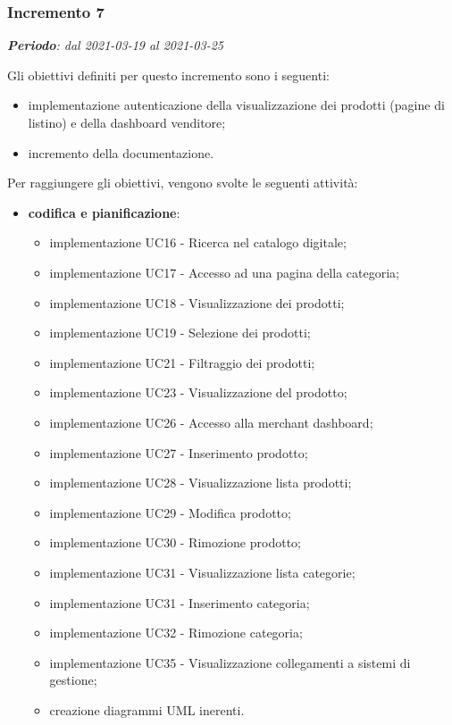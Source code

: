\subsubsection{Incremento 7}
\textit{\textbf{Periodo}: dal 2021-03-19 al 2021-03-25}

Gli obiettivi definiti per questo incremento sono i seguenti:
\begin{itemize}
\item implementazione autenticazione della visualizzazione dei prodotti (pagine di listino) e della dashboard venditore;
\item incremento della documentazione.
\end{itemize}

Per raggiungere gli obiettivi, vengono svolte le seguenti attività:
\begin{itemize}

\item \textbf{codifica e pianificazione}:
\begin{itemize}
\item implementazione UC16 - Ricerca nel catalogo digitale;
\item implementazione UC17 - Accesso ad una pagina della categoria;
\item implementazione UC18 - Visualizzazione dei prodotti;
\item implementazione UC19 - Selezione dei prodotti;
\item implementazione UC21 - Filtraggio dei prodotti;
\item implementazione UC23 - Visualizzazione del prodotto;
\item implementazione UC26 - Accesso alla merchant dashboard;
\item implementazione UC27 - Inserimento prodotto;
\item implementazione UC28 - Visualizzazione lista prodotti;
\item implementazione UC29 - Modifica prodotto;
\item implementazione UC30 - Rimozione prodotto;
\item implementazione UC31 - Visualizzazione lista categorie;
\item implementazione UC31 - Inserimento categoria;
\item implementazione UC32 - Rimozione categoria;
\item implementazione UC35 - Visualizzazione collegamenti a sistemi di gestione;
\item creazione diagrammi UML inerenti.


\end{itemize}
\end{itemize}
